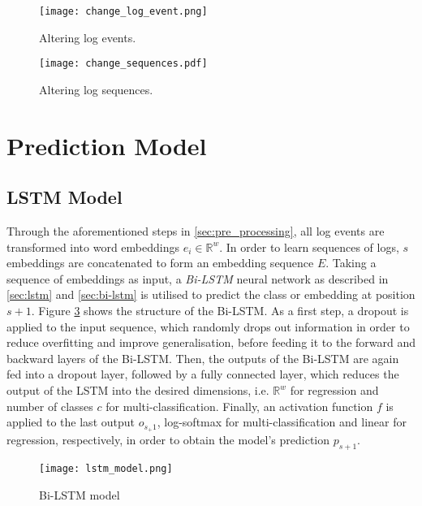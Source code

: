 \begin{figure}[H]
	\centering
	\texttt{[image: change\_log\_event.png]}
	\caption{Altering log events.}
	\label{fig:changelogevent}
\end{figure}

\begin{figure}[H]
	\centering
	\texttt{[image: change\_sequences.pdf]}
	\caption{Altering log sequences.}
	\label{fig:changesequence}
\end{figure}




\section{Prediction Model\label{sec:prediction_model}}

\subsection{LSTM Model\label{sec:lstm-model}}
Through the aforementioned steps in \ref{sec:pre_processing}, all log events are transformed into word embeddings $e_i \in \mathbb{R}^w$. In order to learn sequences of logs, $s$ embeddings are concatenated to form an embedding sequence $E$. Taking a sequence of embeddings as input, a \textit{Bi-LSTM} neural network as described in \ref{sec:lstm} and \ref{sec:bi-lstm} is utilised to predict the class or embedding at position $s+1$. Figure \ref{fig:lstm_model} shows the structure of the Bi-LSTM. As a first step, a dropout is applied to the input sequence, which randomly drops out information in order to reduce overfitting and improve generalisation, before feeding it to the forward and backward layers of the Bi-LSTM. Then, the outputs of the Bi-LSTM are again fed into a dropout layer, followed by a fully connected layer, which reduces the output of the LSTM into the desired dimensions, i.e. $\mathbb{R}^w$ for regression and number of classes $c$ for multi-classification. Finally, an activation function $f$ is applied to the last output $o_{s_+1}$, log-softmax for multi-classification and linear for regression, respectively, in order to obtain the model's prediction $p_{s+1}$.


\begin{figure}[H]
	\centering	
	\texttt{[image: lstm\_model.png]}
	\caption{Bi-LSTM model}
	\label{fig:lstm_model}
\end{figure}


